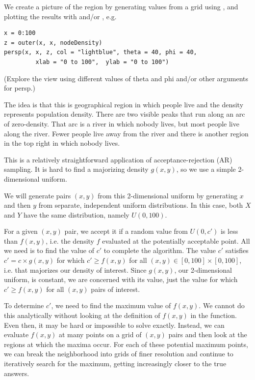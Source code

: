 

 We create a picture of the region by generating values from a grid
 using , and plotting the results with
  and/or , e.g.
\begin{verbatim}
x = 0:100
z = outer(x, x, nodeDensity)
persp(x, x, z, col = "lightblue", theta = 40, phi = 40,
         xlab = "0 to 100",  ylab = "0 to 100")
\end{verbatim}
 (Explore the view using different values of theta and phi
  and/or other arguments for persp.)

  The idea is that this is geographical region in which people live
  and the density represents population density.  There are two
  visible peaks that run along an arc of zero-density.  That arc is a
  river in which nobody lives, but most people live along the river.
  Fewer people live away from the river and there is another
  region in the top right in which nobody lives.

This is a relatively straightforward application of
acceptance-rejection (AR) sampling.  It is hard to find a majorizing
density $g(x, y)$, so we use a simple 2-dimensional uniform.

We will generate pairs $(x, y)$ from this 2-dimensional uniform by
generating $x$ and then $y$ from separate, independent uniform
distributions. In this case, both $X$ and $Y$ have the same
distribution, namely $U(0, 100)$.

For a given $(x, y)$ pair, we accept it if a random value from $U(0,
c')$ is less than $f(x, y)$, i.e. the density $f$ evaluated at the
potentially acceptable point.  All we need is to find the value of
$c'$ to complete the algorithm.  The value $c'$ satisfies $c' =
c\times g(x, y)$ for which $c' \ge f(x, y)$ for all $(x, y) \in
[0,100] \times [0, 100]$, i.e. that majorizes our density of interest.
Since $g(x, y)$, our 2-dimensional uniform, is constant, we are
concerned with its value, just the value for which $c' \ge f(x, y)$
for all $(x, y)$ pairs of interest.

To determine $c'$, we need to find the maximum value of $f(x, y)$.  We
cannot do this analytically without looking at the definition of $f(x,
y)$ in the  function. Even then, it may be hard
or impossible to solve exactly.  Instead, we can evaluate $f(x, y)$ at
many points on a grid of $(x, y)$ pairs and then look at the regions
at which the maxima occur.  For each of these potential maximum
points, we can break the neighborhood into grids of finer resolution
and continue to iteratively search for the maximum, getting
increasingly closer to the true answers.

